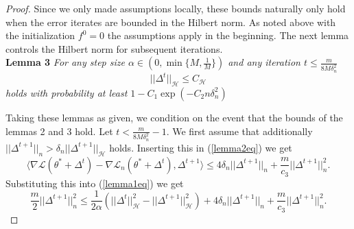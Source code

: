 \begin{proof}
Since we only made assumptions locally, these bounds naturally only hold when the error iterates are bounded in the Hilbert norm. As noted above with the initialization $f^0=0$ the assumptions apply in the beginning. The next lemma controls the Hilbert norm for subsequent iterations.\\
\textbf{Lemma 3}
\textit{For any step size $\alpha \in (0, \min\{M,\frac{1}{M}\})$ and any iteration $t\le \frac{m}{8M\delta_n^2}$}
\begin{equation}
\label{lemma3eq}
||\Delta^t||_{\mathcal{H}} \le C_{\mathcal{H}}
\end{equation}
\textit{holds with probability at least $1-C_1\exp(-C_2n\delta_n^2)$}

Taking these lemmas as given, we condition on the event that the bounds of the lemmas 2 and 3 hold. Let $t<\frac{m}{8M\delta_n^2}-1$. We first assume that additionally $||\Delta^{t+1}||_n > \delta_n ||\Delta^{t+1}||_{\mathcal{H}}$ holds. Inserting this in (\ref{lemma2eq}) we get
\begin{equation*}
\langle\nabla\mathcal{L}(\theta^*+\Delta^t) - \nabla\mathcal{L}_n(\theta^*+\Delta^t), \Delta^{t+1}\rangle \le 4\delta_n||\Delta^{t+1}||_n + \frac{m}{c_3}||\Delta^{t+1}||_n^2.
\end{equation*}
Substituting this into (\ref{lemma1eq}) we get
\begin{equation*}
\frac{m}{2}||\Delta^{t+1}||_n^2\le \frac{1}{2\alpha}(||\Delta^t||_{\mathcal{H}}^2 - ||\Delta^{t+1}||_{\mathcal{H}}^2) + 4\delta_n||\Delta^{t+1}||_n + \frac{m}{c_3}||\Delta^{t+1}||_n^2.
\end{equation*}


\end{proof}
